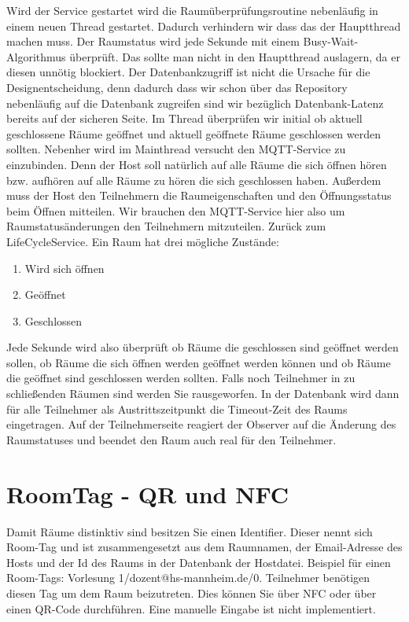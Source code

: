 Wird der Service gestartet wird die Raumüberprüfungsroutine nebenläufig in einem neuen Thread gestartet. Dadurch verhindern wir dass das der Hauptthread machen muss. Der Raumstatus wird jede Sekunde mit einem Busy-Wait-Algorithmus überprüft. Das sollte man nicht in den Hauptthread auslagern, da er diesen unnötig blockiert. Der Datenbankzugriff ist nicht die Ursache für die Designentscheidung, denn dadurch dass wir schon über das Repository nebenläufig auf die Datenbank zugreifen sind wir bezüglich Datenbank-Latenz bereits auf der sicheren Seite.
Im Thread überprüfen wir initial ob aktuell geschlossene Räume geöffnet und aktuell geöffnete Räume geschlossen werden sollten.
 Nebenher wird im Mainthread versucht den MQTT-Service zu einzubinden. Denn der Host soll natürlich auf alle Räume die sich öffnen hören bzw. aufhören auf alle Räume zu hören die sich geschlossen haben. 
Außerdem muss der Host den Teilnehmern die Raumeigenschaften und den Öffnungsstatus beim Öffnen mitteilen. Wir brauchen den MQTT-Service hier also um Raumstatusänderungen den Teilnehmern mitzuteilen.
Zurück zum LifeCycleService.
Ein Raum hat drei mögliche Zustände:
\begin{enumerate}
\item Wird sich öffnen
\item Geöffnet
\item Geschlossen
\end{enumerate}
 Jede Sekunde wird also überprüft ob Räume die geschlossen sind geöffnet werden sollen, ob Räume die sich öffnen werden geöffnet werden können und ob Räume die geöffnet sind geschlossen werden sollten. 
Falls noch Teilnehmer in zu schließenden Räumen sind werden Sie rausgeworfen. In der Datenbank wird dann für alle Teilnehmer als Austrittszeitpunkt die Timeout-Zeit des Raums eingetragen. 
Auf der Teilnehmerseite reagiert der Observer auf die Änderung des Raumstatuses und beendet den Raum auch real für den Teilnehmer.

\section{RoomTag - QR und NFC}
\label{sec:RoomTag - QR und NFC}
Damit Räume distinktiv sind besitzen Sie einen Identifier. Dieser nennt sich Room-Tag und ist zusammengesetzt aus dem Raumnamen, der Email-Adresse des Hosts und der Id des Raums in der Datenbank der Hostdatei. Beispiel für einen Room-Tags: Vorlesung 1/dozent@hs-mannheim.de/0.
Teilnehmer benötigen diesen Tag um dem Raum beizutreten. Dies können Sie über NFC oder über einen QR-Code durchführen. Eine manuelle Eingabe ist nicht implementiert.

